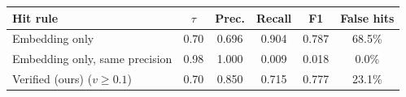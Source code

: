 \begin{tabular}{@{}lccccc@{}}
\toprule
Hit rule & $\tau$ & Prec. & Recall & F1 & False hits \\
\midrule
Embedding only & 0.70 & 0.696 & 0.904 & 0.787 & 68.5\% \\
Embedding only, same precision & 0.98 & 1.000 & 0.009 & 0.018 & 0.0\% \\
Verified (ours) ($v\geq0.1$) & 0.70 & 0.850 & 0.715 & 0.777 & 23.1\% \\
\bottomrule
\end{tabular}
